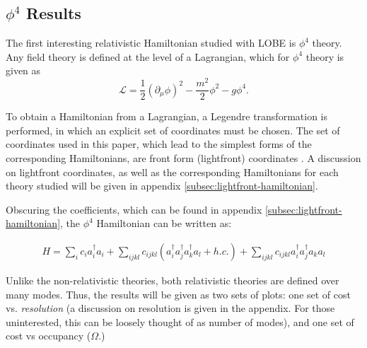 \subsection{$\phi^4$ Results}
\label{sec:phi4_results}

The first interesting relativistic Hamiltonian studied with LOBE is $\phi^4$ theory. 
Any field theory is defined at the level of a Lagrangian, which for $\phi^4$ theory is given as
\begin{equation}
    \mathcal{L} = \frac12 \left(\partial_\mu \phi \right)^2 - \frac{m^2}{2}\phi^2 - g\phi^4.
\end{equation}

To obtain a Hamiltonian from a Lagrangian, a Legendre transformation is performed, in which an explicit set of coordinates must be chosen. 
The set of coordinates used in this paper, which lead to the simplest forms of the corresponding Hamiltonians, are front form (lightfront) coordinates \cite{Dirac1949}.
A discussion on lightfront coordinates, as well as the corresponding Hamiltonians for each theory studied will be given in appendix \ref{subsec:lightfront-hamiltonian}.

Obscuring the coefficients, which can be found in appendix \ref{subsec:lightfront-hamiltonian}, the $\phi^4$ Hamiltonian can be written as:

\begin{align}
    H = \sum_i c_i a_i^\dagger a_i + \sum_{ijkl}c_{ijkl} \left(a_i^\dagger a_j^\dagger a_k^\dagger a_l + h.c. \right) + \sum_{ijkl}c_{ijkl}a_i^\dagger a_j^\dagger a_k a_l
\end{align}

Unlike the non-relativistic theories, both relativistic theories are defined over many modes.
Thus, the results will be given as two sets of plots: one set of cost vs. \textit{resolution} (a discussion on resolution is given in the appendix. For those uninterested, this can be loosely thought of as number of modes), and one set of cost vs occupancy ($\Omega$.)

